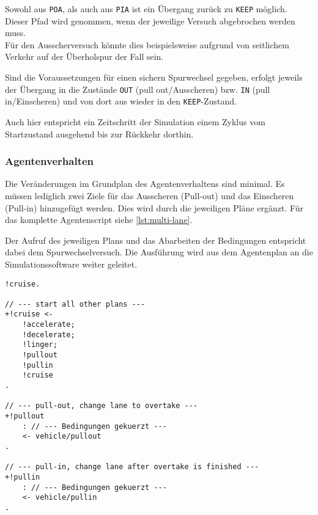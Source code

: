 Sowohl aus \texttt{POA}, als auch aus \texttt{PIA} ist ein Übergang zurück zu \texttt{KEEP} möglich.
Dieser Pfad wird genommen, wenn der jeweilige Versuch abgebrochen werden muss.
\\
Für den Ausscherversuch könnte dies beispielsweise aufgrund von seitlichem Verkehr auf der Überholspur der Fall sein.

Sind die Voraussetzungen für einen sichern Spurwechsel gegeben, erfolgt jeweils der Übergang in die Zustände \texttt{OUT} (pull out/Ausscheren) bzw. \texttt{IN} (pull in/Einscheren) und von dort aus wieder in den \texttt{KEEP}-Zustand.

Auch hier entspricht ein Zeitschritt der Simulation einem Zyklus vom Startzustand ausgehend bis zur Rückkehr dorthin.



\subsubsection{Agentenverhalten}
\label{sec:agentplan-multilane}

Die Veränderungen im Grundplan des Agentenverhaltens sind minimal. 
Es müssen lediglich zwei Ziele für das Ausscheren (Pull-out) und das Einscheren (Pull-in) hinzugefügt werden.
Dies wird durch die jeweiligen Pläne ergänzt.
Für das komplette Agentenscript siehe \cref{lst:multi-lane}.

Der Aufruf des jeweiligen Plans und das Abarbeiten der Bedingungen entspricht dabei dem Spurwechselversuch.
Die Ausführung wird aus dem Agentenplan an die Simulationssoftware weiter geleitet.

\begin{minipage}[hptb]{0.95\textwidth}
\begin{lstlisting}[style=asl, 
                   keywords={!pullout,!pullin}, 
                   keywords={[2]vehicle/pullout,vehicle/pullin}, 
                   keywords={[3]}, 
                   caption={Auszug aus Agentenscript: multi lane-Version},
                   label={lst:multilane-auszug}]      
!cruise.

// --- start all other plans ---
+!cruise <-
    !accelerate;
    !decelerate;
    !linger;
    !pullout
    !pullin
    !cruise
.

// --- pull-out, change lane to overtake ---
+!pullout
    : // --- Bedingungen gekuerzt ---
    <- vehicle/pullout
.

// --- pull-in, change lane after overtake is finished ---
+!pullin
    : // --- Bedingungen gekuerzt ---
    <- vehicle/pullin
.\end{lstlisting}
\end{minipage}

